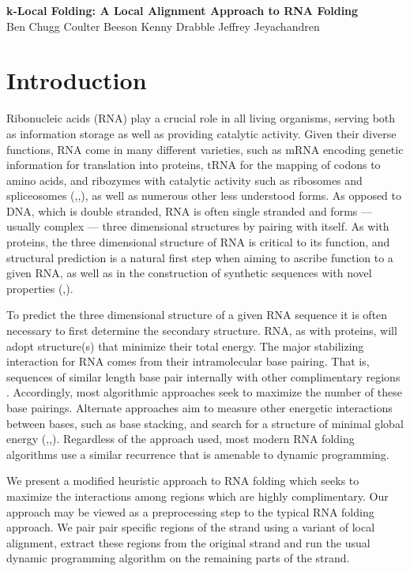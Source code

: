 \documentclass[11pt]{article}
\begin{document}
\begin{center}
\Large\textbf{k-Local Folding: A Local Alignment Approach to RNA Folding}\\
\vspace*{0.8cm}
\large 
Ben Chugg \qquad
Coulter Beeson \qquad
Kenny Drabble \qquad
Jeffrey Jeyachandren 
\end{center}
\vspace*{0.3cm}

\section{Introduction}

Ribonucleic acids (RNA) play a crucial role in all living organisms, serving both as information storage as well as providing catalytic activity. Given their diverse functions, RNA come in many different varieties, such as mRNA encoding genetic information for translation into proteins, tRNA for the mapping of codons to amino acids, and ribozymes with catalytic activity such as ribosomes and spliceosomes (\cite{eight},\cite{nine},\cite{ten}), as well as numerous other less understood forms. As opposed to DNA, which is double stranded, RNA is often single stranded and forms --- usually complex ---  three dimensional structures by pairing with itself. As with proteins, the three dimensional structure of RNA is critical to its function, and structural prediction is a natural first step when aiming to ascribe function to a given RNA, as well as in the construction of synthetic sequences with novel properties (\cite{one},\cite{two}). 

To predict the three dimensional structure of a given RNA sequence it is often necessary to first determine the secondary structure. RNA, as with proteins, will adopt structure(s) that minimize their total energy. The major stabilizing interaction for RNA comes from their intramolecular base pairing. That is, sequences of similar length base pair internally with other complimentary regions \cite{three}. Accordingly, most algorithmic approaches seek to maximize the number of these base pairings. Alternate approaches aim to measure other energetic interactions between bases, such as base stacking, and search for a structure of minimal global energy (\cite{four},\cite{five},\cite{eight}). Regardless of the approach used, most modern RNA folding algorithms use a similar recurrence that is amenable to dynamic programming. 

We present a modified heuristic approach to RNA folding which seeks to maximize the interactions among regions which are highly complimentary. Our approach may be viewed as a preprocessing step to the typical RNA folding approach. We pair pair specific regions of the strand using a variant of local alignment, extract these regions from the original strand and run the usual dynamic programming algorithm on the remaining parts of the strand. 
\end{document}
